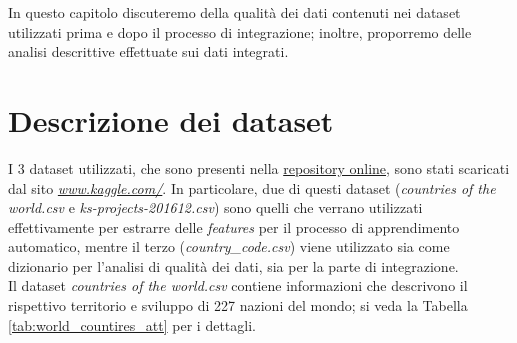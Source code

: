 In questo capitolo discuteremo della qualità dei dati contenuti nei dataset utilizzati prima e dopo il processo di integrazione; inoltre, proporremo delle analisi descrittive effettuate sui dati integrati. 
\section{Descrizione dei dataset}
I 3 dataset utilizzati, che sono presenti nella \href{https://gitlab.com/Daniele-Papetti/kickstarterprediction}{repository online}, sono stati scaricati dal sito \href{https://www.kaggle.com/}{\emph{www.kaggle.com/}}.
In particolare, due di questi dataset (\textit{countries of the world.csv} e \textit{ks-projects-201612.csv}) sono quelli che verrano utilizzati effettivamente per estrarre delle \textit{features} per il processo di apprendimento automatico, mentre il terzo (\textit{country\_code.csv}) viene utilizzato sia come dizionario per l'analisi di qualità dei dati, sia per la parte di integrazione.\\
Il dataset \textit{countries of the world.csv} contiene informazioni che descrivono il rispettivo territorio e sviluppo di 227 nazioni del mondo; si veda la Tabella \ref{tab:world_countires_att} per i dettagli.
